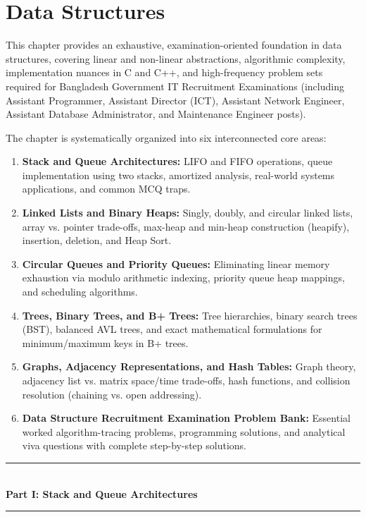 \chapter{Data Structures}
\label{ch:data_structures}

This chapter provides an exhaustive, examination-oriented foundation in data structures, covering linear and non-linear abstractions, algorithmic complexity, implementation nuances in C and C++, and high-frequency problem sets required for Bangladesh Government IT Recruitment Examinations (including Assistant Programmer, Assistant Director (ICT), Assistant Network Engineer, Assistant Database Administrator, and Maintenance Engineer posts).

The chapter is systematically organized into six interconnected core areas:
\begin{enumerate}[label=\bfseries Part \Roman*:, leftmargin=*, align=left, itemsep=4pt, parsep=2pt]
    \item \textbf{Stack and Queue Architectures:} LIFO and FIFO operations, queue implementation using two stacks, amortized analysis, real-world systems applications, and common MCQ traps.
    \item \textbf{Linked Lists and Binary Heaps:} Singly, doubly, and circular linked lists, array vs. pointer trade-offs, max-heap and min-heap construction (heapify), insertion, deletion, and Heap Sort.
    \item \textbf{Circular Queues and Priority Queues:} Eliminating linear memory exhaustion via modulo arithmetic indexing, priority queue heap mappings, and scheduling algorithms.
    \item \textbf{Trees, Binary Trees, and B+ Trees:} Tree hierarchies, binary search trees (BST), balanced AVL trees, and exact mathematical formulations for minimum/maximum keys in B+ trees.
    \item \textbf{Graphs, Adjacency Representations, and Hash Tables:} Graph theory, adjacency list vs. matrix space/time trade-offs, hash functions, and collision resolution (chaining vs. open addressing).
    \item \textbf{Data Structure Recruitment Examination Problem Bank:} Essential worked algorithm-tracing problems, programming solutions, and analytical viva questions with complete step-by-step solutions.
\end{enumerate}

\newpage
\begin{center}
\vspace{1em}
{\color{primary}\rule{0.5\textwidth}{1.5pt}}\\[6pt]
{\Large\bfseries\color{primary} Part I: Stack and Queue Architectures}\\[3pt]
{\color{primary}\rule{0.5\textwidth}{1.5pt}}
\vspace{1em}
\end{center}

